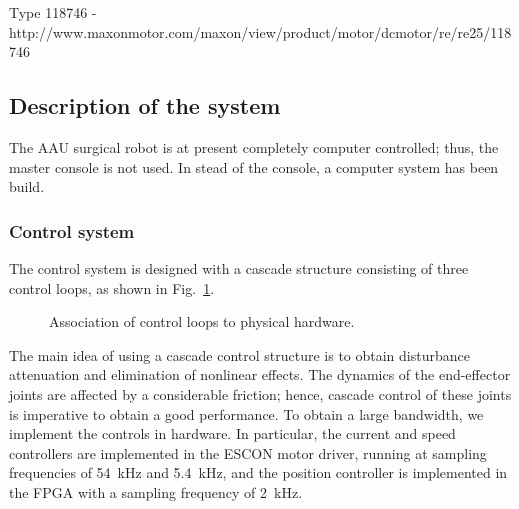 \documentclass[a4paper, 10 pt, conference]{ieeeconf}      %
\begin{document}
Type 118746 - http://www.maxonmotor.com/maxon/view/product/motor/dcmotor/re/re25/118746
\cleardoublepage
\subsection{Description of the system}
The AAU surgical robot is at present completely computer controlled; thus, the master console is not used. In stead of the console, a computer system has been build. 

%




\subsubsection{Control system}
The control system is designed with a cascade structure consisting of three control loops, as shown in Fig.~\ref{fig:hardwareOverview}.
\begin{figure}[!ht]
\centering
  \def\svgwidth{\columnwidth}
\graphicspath{{graphics/}}
\begin{footnotesize}

\end{footnotesize}
\caption{Association of control loops to physical hardware.}
\label{fig:hardwareOverview}
\end{figure}

The main idea of using a cascade control structure is to obtain disturbance attenuation and elimination of nonlinear effects. The dynamics of the end-effector joints are affected by a considerable friction; hence, cascade control of these joints is imperative to obtain a good performance. To obtain a large bandwidth, we implement the controls in hardware. In particular, the current and speed controllers are implemented in the ESCON motor driver, running at sampling frequencies of 54~kHz and 5.4~kHz, and the position controller is implemented in the FPGA with a sampling frequency of 2~kHz.
\end{document}
